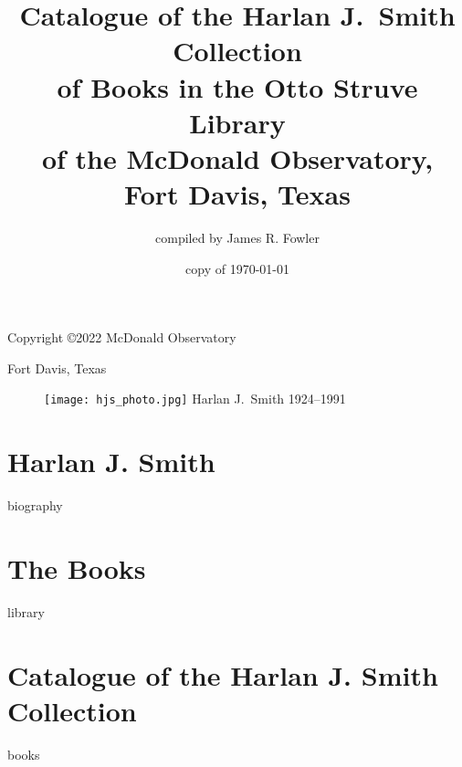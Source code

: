 \documentclass[letterpaper]{book}
\begin{document}
\frontmatter
\pagestyle{empty}
\title{Catalogue of the Harlan J.~Smith Collection \\
  of Books in the Otto Struve Library \\
  of the McDonald Observatory, \\
  Fort Davis, Texas}
\author{compiled by James R. Fowler}
\date{copy of \today}
\maketitle
\clearpage

\vspace*{5 in}
\centerline{Copyright \copyright 2022 McDonald Observatory}
\centerline{Fort Davis, Texas}
\clearpage

\pagestyle{plain}
\begin{figure}
  \centering
  \texttt{[image: hjs\_photo.jpg]}
  Harlan J.~Smith 1924--1991
  \label{fig:hjs}
\end{figure}
\clearpage

\section*{Harlan J. Smith}
{biography}
\clearpage

\section*{The Books}
{library}
\clearpage

\printbibliography

\mainmatter
\section*{Catalogue of the Harlan J. Smith Collection}
{books}
\end{document}
